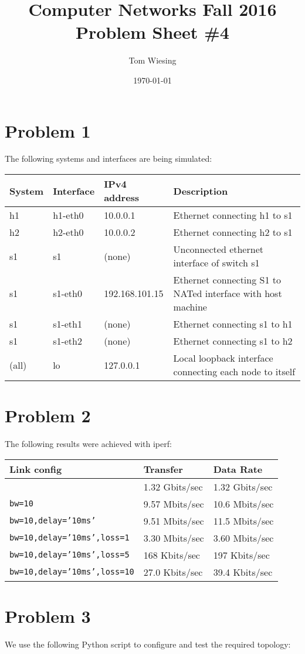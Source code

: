 \documentclass[a4paper,10pt]{article}
\title{Computer Networks Fall 2016\\Problem Sheet \#4}
\author{Tom Wiesing}
\date{\today}
\begin{document}
\maketitle

\section{Problem 1}
The following systems and interfaces are being simulated:

\begin{tabular}{ l | l | l | l}
  System & Interface & IPv4 address & Description \\
  \hline
  h1 & h1-eth0 & 10.0.0.1 & Ethernet connecting h1 to s1 \\
  \hline
  h2 & h2-eth0 & 10.0.0.2 & Ethernet connecting h2 to s1 \\
  \hline
  s1 & s1 & (none) & Unconnected ethernet interface of switch s1\\
  s1 & s1-eth0 & 192.168.101.15 & Ethernet connecting S1 to NATed interface with host machine\\
  s1 & s1-eth1 & (none) & Ethernet connecting s1 to h1\\
  s1 & s1-eth2 & (none) & Ethernet connecting s1 to h2\\
  \hline
  (all) & lo & 127.0.0.1 & Local loopback interface connecting each node to itself\\
  \hline
\end{tabular}

\section{Problem 2}

The following results were achieved with iperf:

\begin{tabular}{ l | l | l}
  Link config & Transfer & Data Rate \\
  \hline
  & 1.32 Gbits/sec & 1.32 Gbits/sec\\
  \texttt{bw=10} & 9.57 Mbits/sec & 10.6 Mbits/sec \\
  \texttt{bw=10,delay='10ms'} & 9.51 Mbits/sec & 11.5 Mbits/sec \\
  \texttt{bw=10,delay='10ms',loss=1} & 3.30 Mbits/sec & 3.60 Mbits/sec \\
  \texttt{bw=10,delay='10ms',loss=5} & 168 Kbits/sec & 197 Kbits/sec \\
  \texttt{bw=10,delay='10ms',loss=10} & 27.0 Kbits/sec & 39.4 Kbits/sec \\
  \hline
\end{tabular}

\section{Problem 3}

We use the following Python script to configure and test the required topology:


\end{document}
